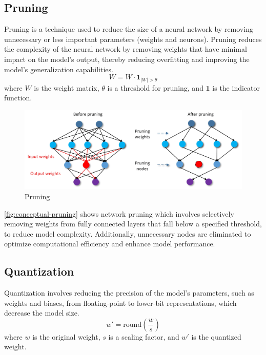 \documentclass{ioereport}
\begin{document}
    \subsection{Pruning}
    Pruning is a technique used to reduce the size of a neural network by removing unnecessary or less important parameters (weights and neurons). Pruning reduces the complexity of the neural network by removing weights that have minimal impact on the model’s output, thereby reducing overfitting and improving the model's generalization capabilities.
    \begin{equation}
        W = W \cdot \mathbf{1}_{|W| > \theta}
    \end{equation}
    where \( W \) is the weight matrix, \( \theta \) is a threshold for pruning, and \( \mathbf{1} \) is the indicator function.

    \begin{figure}[H]
            \centering
            \includegraphics[width=\linewidth]{assets/conceptual figure of pruning.png}
            \caption{Pruning}
            \label{fig:conceptual-pruning}
    \end{figure}
    \autoref{fig:conceptual-pruning} shows network pruning which involves selectively removing weights from fully connected layers that fall below a specified threshold, to reduce model complexity. Additionally, unnecessary nodes are eliminated to optimize computational efficiency and enhance model performance.
    
    \subsection{Quantization}
    Quantization involves reducing the precision of the model's parameters, such as weights and biases, from floating-point to lower-bit representations, which decrease the model size.
    \begin{equation}
        w' = \text{round}\left(\frac{w}{s}\right)
    \end{equation}
    where \( w \) is the original weight, \( s \) is a scaling factor, and \( w' \) is the quantized weight.
\end{document}
